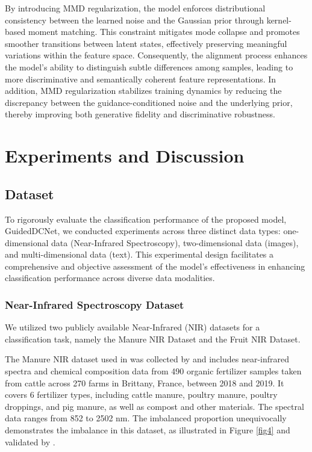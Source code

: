 \documentclass[a4paper,fleqn]{cas-sc}
\begin{document}
By introducing MMD regularization, the model enforces distributional consistency between the learned noise and the Gaussian prior through kernel-based moment matching. This constraint mitigates mode collapse and promotes smoother transitions between latent states, effectively preserving meaningful variations within the feature space. Consequently, the alignment process enhances the model’s ability to distinguish subtle differences among samples, leading to more discriminative and semantically coherent feature representations. In addition, MMD regularization stabilizes training dynamics by reducing the discrepancy between the guidance-conditioned noise and the underlying prior, thereby improving both generative fidelity and discriminative robustness.


\section{Experiments and Discussion}
\subsection{Dataset}
To rigorously evaluate the classification performance of the proposed model, GuidedDCNet, we conducted experiments across three distinct data types: one-dimensional data (Near-Infrared Spectroscopy), two-dimensional data (images), and multi-dimensional data (text). This experimental design facilitates a comprehensive and objective assessment of the model's effectiveness in enhancing classification performance across diverse data modalities.

\subsubsection{Near-Infrared Spectroscopy Dataset}
We utilized two publicly available Near-Infrared (NIR) datasets for a classification task, namely the Manure NIR Dataset and the Fruit NIR Dataset.

The Manure NIR dataset used in was collected by \cite{morvan2021dataset} and includes near-infrared spectra and chemical composition data from 490 organic fertilizer samples taken from cattle across 270 farms in Brittany, France, between 2018 and 2019. It covers 6 fertilizer types, including cattle manure, poultry manure, poultry droppings, and pig manure, as well as compost and other materials. The spectral data ranges from 852 to 2502 nm. The imbalanced proportion unequivocally demonstrates the imbalance in this dataset, as illustrated in Figure \ref{fig4} and validated by \cite{hieu2024nirsvit}. 
\end{document}
